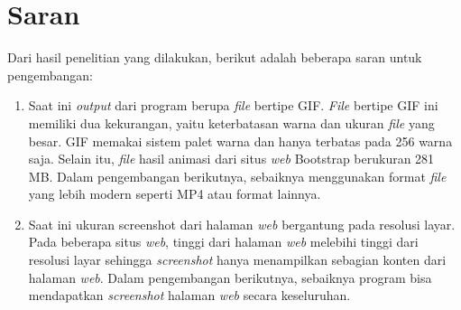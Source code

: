 \section{Saran}
\label{sec:saran}
Dari hasil penelitian yang dilakukan, berikut adalah beberapa saran untuk pengembangan:
\begin{enumerate}
\item Saat ini \textit{output} dari program berupa \textit{file} bertipe GIF. \textit{File} bertipe GIF ini memiliki dua kekurangan, yaitu keterbatasan warna dan ukuran \textit{file} yang besar. GIF memakai sistem palet warna dan hanya terbatas pada 256 warna saja. Selain itu, \textit{file} hasil animasi dari situs \textit{web} Bootstrap berukuran 281 MB. Dalam pengembangan berikutnya, sebaiknya menggunakan format \textit{file} yang lebih modern seperti MP4 atau format lainnya. 

 
\item Saat ini ukuran screenshot dari halaman \textit{web} bergantung pada resolusi layar. Pada beberapa situs \textit{web}, tinggi dari halaman \textit{web} melebihi tinggi dari resolusi layar sehingga \textit{screenshot} hanya menampilkan sebagian konten dari halaman \textit{web}. Dalam pengembangan berikutnya, sebaiknya program bisa mendapatkan \textit{screenshot} halaman \textit{web} secara keseluruhan.  


 
\end{enumerate}